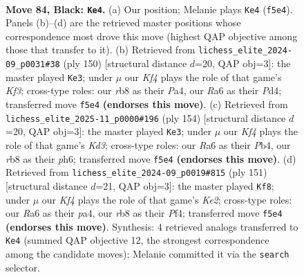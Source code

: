 \documentclass[11pt]{article}
\begin{document}
\clearpage

\begin{figure}[p]\centering
\begin{subfigure}{0.46\textwidth}\centering
\resizebox{\linewidth}{!}{%
\newchessgame
\chessboard[
  setfen={1R6/6p1/r4p2/3P1k1p/7P/6P1/2N3K1/8 b - - 8 84},
  showmover=false,
  pgfstyle=straightmove, color=movearrow, markmove={f5-e4}
]}
\caption{}
\end{subfigure}\hfill
\begin{subfigure}{0.46\textwidth}\centering
\resizebox{\linewidth}{!}{%
\newchessgame
\chessboard[
  setfen={8/4k3/7p/p2p2pP/P2P2P1/5K2/8/8 w - - 56 76},
  showmover=false,
  pgfstyle=straightmove, color=movearrow, markmove={f3-e3}
]}
\caption{}
\end{subfigure}
\\[4pt]
\begin{subfigure}{0.46\textwidth}\centering
\resizebox{\linewidth}{!}{%
\newchessgame
\chessboard[
  setfen={8/8/3k3p/1p2p1p1/1P2P1P1/3K3P/8/8 w - - 55 78},
  showmover=false,
  pgfstyle=straightmove, color=movearrow, markmove={d3-e3}
]}
\caption{}
\end{subfigure}\hfill
\begin{subfigure}{0.46\textwidth}\centering
\resizebox{\linewidth}{!}{%
\newchessgame
\chessboard[
  setfen={8/4k3/3p4/p4Pp1/P1P2pP1/3K4/8/8 b - - 0 76},
  showmover=false,
  pgfstyle=straightmove, color=movearrow, markmove={e7-f8}
]}
\caption{}
\end{subfigure}
\caption{\textbf{Move 84, Black: \texttt{Ke4}.} (a) Our position; Melanie plays \texttt{Ke4} (\texttt{f5e4}). Panels (b)--(d) are the retrieved master positions whose correspondence most drove this move (highest QAP objective among those that transfer to it). (b) Retrieved from \texttt{lichess\_elite\_2024-09\_p0031\#38} (ply 150) [structural distance $d$=20, QAP obj=3]: the master played \texttt{Ke3}; under $\mu$ our \emph{Kf4} plays the role of that game's \emph{Kf3}; cross-type roles: our \emph{r}b8 as their \emph{P}a4, our \emph{R}a6 as their \emph{P}d4; transferred move \texttt{f5e4} \textbf{(endorses this move)}. (c) Retrieved from \texttt{lichess\_elite\_2025-11\_p0000\#196} (ply 154) [structural distance $d$=20, QAP obj=3]: the master played \texttt{Ke3}; under $\mu$ our \emph{Kf4} plays the role of that game's \emph{Kd3}; cross-type roles: our \emph{R}a6 as their \emph{P}b4, our \emph{r}b8 as their \emph{p}h6; transferred move \texttt{f5e4} \textbf{(endorses this move)}. (d) Retrieved from \texttt{lichess\_elite\_2024-09\_p0019\#815} (ply 151) [structural distance $d$=21, QAP obj=3]: the master played \texttt{Kf8}; under $\mu$ our \emph{Kf4} plays the role of that game's \emph{Ke2}; cross-type roles: our \emph{R}a6 as their \emph{p}a4, our \emph{r}b8 as their \emph{P}f4; transferred move \texttt{f5e4} \textbf{(endorses this move)}. Synthesis: 4 retrieved analogs transferred to \texttt{Ke4} (summed QAP objective 12, the strongest correspondence among the candidate moves); Melanie committed it via the \texttt{search} selector.}
\label{fig:thought-m167}
\end{figure}
\end{document}
